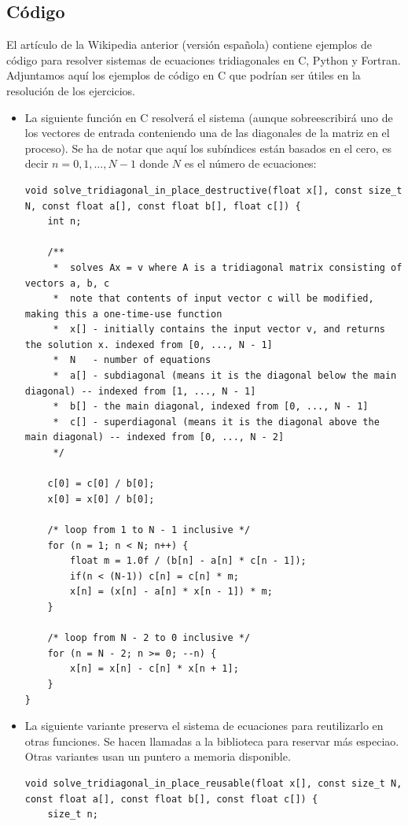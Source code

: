 \documentclass[12pt,spanish]{iopart}
\begin{document}
\subsection{Código}

El artículo de la Wikipedia anterior (versión española) contiene ejemplos de código para resolver sistemas de ecuaciones tridiagonales en C, Python y Fortran. Adjuntamos aquí los ejemplos de código en C que podrían ser útiles en la resolución de los ejercicios.
\begin{itemize}
\item La siguiente función en C resolverá el sistema (aunque sobreescribirá uno de los vectores de entrada conteniendo una de las diagonales de la matriz en el proceso). Se ha de notar que aquí los subíndices están basados en el cero, es decir ${\displaystyle n=0,1,\dots ,N-1}$ donde $N$ es el número de ecuaciones:
\begin{lstlisting}
void solve_tridiagonal_in_place_destructive(float x[], const size_t N, const float a[], const float b[], float c[]) {
    int n;
    
    /**
     *  solves Ax = v where A is a tridiagonal matrix consisting of vectors a, b, c
     *  note that contents of input vector c will be modified, making this a one-time-use function
     *  x[] - initially contains the input vector v, and returns the solution x. indexed from [0, ..., N - 1]
     *  N   - number of equations
     *  a[] - subdiagonal (means it is the diagonal below the main diagonal) -- indexed from [1, ..., N - 1]
     *  b[] - the main diagonal, indexed from [0, ..., N - 1]
     *  c[] - superdiagonal (means it is the diagonal above the main diagonal) -- indexed from [0, ..., N - 2]
     */
    
    c[0] = c[0] / b[0];
    x[0] = x[0] / b[0];
    
    /* loop from 1 to N - 1 inclusive */
    for (n = 1; n < N; n++) {
        float m = 1.0f / (b[n] - a[n] * c[n - 1]);
        if(n < (N-1)) c[n] = c[n] * m;
        x[n] = (x[n] - a[n] * x[n - 1]) * m;
    }
    
    /* loop from N - 2 to 0 inclusive */
    for (n = N - 2; n >= 0; --n) {
        x[n] = x[n] - c[n] * x[n + 1];
    }
}
\end{lstlisting}
\item La siguiente variante preserva el sistema de ecuaciones para reutilizarlo en otras funciones. Se hacen llamadas a la biblioteca para reservar más especiao. Otras variantes usan un puntero a memoria disponible.
\begin{lstlisting}
void solve_tridiagonal_in_place_reusable(float x[], const size_t N, const float a[], const float b[], const float c[]) {
    size_t n;
    

\end{lstlisting}
\end{itemize}
\end{document}
